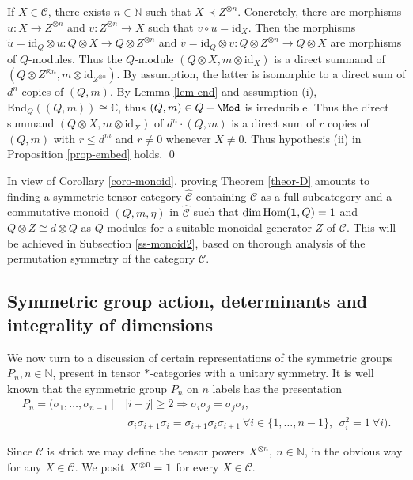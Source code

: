 \documentclass[11pt]{article}
\theoremstyle{definition}
\theoremstyle{definition}
\theoremstyle{remark}
\newcommand{\impl}{\Rightarrow}
\def\2#1{{\mathcal #1}}
\def\7#1{{\mathbb #1}}
\def\1#1{{\bf #1}}
\newcommand{\Hom}{\mathrm{Hom}}
\newcommand{\End}{\mathrm{End}}
\newcommand{\rarr}{\rightarrow}
\def\id{\mathrm{id}}
\begin{document}
\prf If $X\in\2C$, there exists $n\in\7N$ such that $X\prec Z^{\otimes n}$. Concretely, there are
morphisms $u:X\rarr Z^{\otimes n}$ and $v:Z^{\otimes n}\rarr X$ such that $v\circ u=\id_X$.
Then the morphisms $\tilde{u}=\id_Q\otimes u: Q\otimes X\rarr Q\otimes Z^{\otimes n}$ and
$\tilde{v}=\id_Q\otimes v:Q\otimes Z^{\otimes n}\rarr Q\otimes X$ are morphisms of $Q$-modules.
Thus the $Q$-module $(Q\otimes X,m\otimes\id_X)$ is a direct summand of 
$(Q\otimes Z^{\otimes n},m\otimes\id_{Z^{\otimes n}})$. By assumption, the latter is isomorphic to a
direct sum of $d^n$ copies of $(Q,m)$. By Lemma \ref{lem-end} and assumption (i),
$\End_Q((Q,m))\cong\7C$, thus $(Q,m)\in Q-\Mod$ is irreducible. Thus the direct summand 
$(Q\otimes X,m\otimes\id_X)$ of $d^n\cdot(Q,m)$ is a direct sum of $r$ copies of $(Q,m)$ with 
$r\le d^m$ and $r\ne 0$ whenever $X\ne 0$. Thus hypothesis (ii) in Proposition \ref{prop-embed} holds.
\qed

In view of Corollary \ref{coro-monoid}, proving Theorem \ref{theor-D} amounts to finding a symmetric
tensor category $\widehat{\2C}$ containing $\2C$ as a full subcategory and a commutative monoid
$(Q,m,\eta)$ in $\widehat{\2C}$ such that $\dim\Hom(\11,Q)=1$ and $Q\otimes Z\cong d\otimes Q$ as
$Q$-modules for a suitable monoidal generator $Z$ of $\2C$. This will be achieved in Subsection
\ref{ss-monoid2}, based on thorough analysis of the permutation symmetry of the category $\2C$.




\subsection{Symmetric group action, determinants and
  integrality of dimensions} \label{saggy}
We now turn to a discussion of certain representations of the symmetric groups $P_n, n\in\7N$,
present in tensor $*$-categories with a unitary symmetry. It is well known that the symmetric group
$P_n$ on $n$ labels has the presentation 
\[ \begin{aligned} P_n=(\sigma_1,\ldots,\sigma_{n-1} \
  | & \ |i-j|\ge 2\impl\sigma_i\sigma_j =
  \sigma_j\sigma_i, \\ & \ \ 
   \sigma_i\sigma_{i+1}\sigma_i=\sigma_{i+1}\sigma_i\sigma_{i+ 1} \ \forall i\in\{1,\ldots,n-1\},
   \ \ \sigma_i^2=1 \ \forall i). \end{aligned} \]

   Since $\2C$ is strict we may define the tensor powers $X^{\otimes
     n},\ n\in\7N$, in the obvious way for any $X\in\2C$. We posit
   $X^{\otimes 0}=\11$ for every $X\in\2C$.
\end{document}
